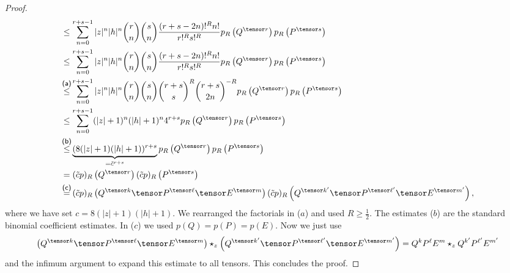 \begin{proof}
\begin{align*}
        & \leq
        \sum\limits_{n=0}^{r + s - 1}
        |z|^n |h|^n
        \binom{r}{n} \binom{s}{n}
        \frac{(r + s - 2n)!^R n!}{r!^R s!^R}
        p_R \left(Q^{\tensor r} \right)
        p_R \left(P^{\tensor s} \right)
        \\
        & \leq
        \sum\limits_{n=0}^{r + s - 1}
        |z|^n |h|^n
        \binom{r}{n} \binom{s}{n}
        \frac{(r + s - 2n)!^R n!}{r!^R s!^R}
        p_R \left(Q^{\tensor r} \right)
        p_R \left(P^{\tensor s} \right)
        \\
        & \ot{(a)}{\leq}
        \sum\limits_{n=0}^{r + s - 1}
        |z|^n |h|^n
        \binom{r}{n} \binom{s}{n}
        \binom{r + s}{s}^R
        \binom{r + s}{2n}^{-R}
        p_R \left(Q^{\tensor r} \right)
        p_R \left(P^{\tensor s} \right)
        \\
        & \leq
        \sum\limits_{n=0}^{r + s - 1}
        (|z| + 1)^n (|h| + 1)^n
        4^{r + s}
        p_R \left(Q^{\tensor r} \right)
        p_R \left(P^{\tensor s} \right)
        \\
        & \ot{(b)}{ \leq }
        \underbrace{
        (8 (|z| + 1) (|h| + 1))^{r + s}
        }_{ = \tilde{c}^{r + s}}
        p_R \left(Q^{\tensor r} \right)
        p_R \left(P^{\tensor s} \right)
        \\
        & =
        (\tilde{c} p)_R \left(Q^{\tensor r} \right)
        (\tilde{c} p)_R \left(P^{\tensor s} \right)
        \\
        & \ot{(c)}{ = }
        (\tilde{c} p)_R \left(
        Q^{\tensor k} \tensor
        P^{\tensor \ell} \tensor
        E^{\tensor m} \right)
        (\tilde{c} p)_R \left(
        Q^{\tensor k'} \tensor
        P^{\tensor \ell'} \tensor
        E^{\tensor m'} \right),
    \end{align*}
    where we have set $c = 8 (|z| + 1) (|h| + 1)$. We rearranged the factorials in 
    ($a$) and used $R \geq \frac{1}{2}$. The estimates ($b$) are the standard 
    binomial coefficient estimates. In ($c$) we used $p(Q) = p(P) = p(E)$. Now
    we just use
    \begin{equation*}
        \left(
        	Q^{\tensor k} \tensor
        	P^{\tensor \ell} \tensor
        	E^{\tensor m}
        \right)
        \ostar_z
        \left(
        	Q^{\tensor k'} \tensor
        	P^{\tensor \ell'} \tensor
        	E^{\tensor m'}
        \right)
        =
        Q^k P^{\ell} E^m
        \ostar_z
        Q^{k'} P^{\ell'} E^{m'}
    \end{equation*}
    and the infimum argument to expand this estimate to all tensors.
    This concludes the proof.
\end{proof}

